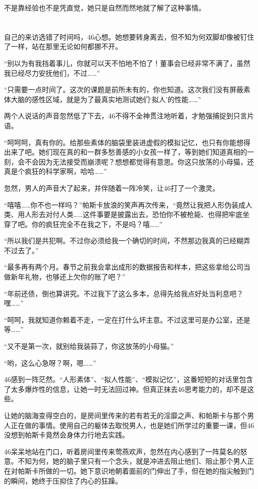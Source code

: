 不是靠经验也不是凭直觉，她只是自然而然地就了解了这种事情。

\section*{}

自己的来访选错了时间吗，46心想。她想要转身离去，但不知为何双脚却像被钉住了一样，站在那里无论如何都挪不开。

“别以为有我挡着事儿，你就可以天不怕地不怕了！董事会已经非常不满了，虽然我已经尽力安抚他们，不过……”

“只需要一点时间了。这次的课题是前所未有的，你也知道。这次我们没有屏蔽素体大脑的感性区域，就是为了最真实地测试她们‘拟人’的性能……”

两个人说话的声音忽然低了下去，46不得不全神贯注地听着，才勉强捕捉到只言片语。

“呵呵呵，真有你的。给那些素体的脑袋里装进虚假的模拟记忆，也只有你能想得出来了吧。她们现在真的和一群多愁善感的小女孩一样了，等到她们知道真相的一刻，会不会因为无法接受而崩溃呢？想想都觉得有意思。你这只放荡的小母猫，还真是个疯狂的科学家啊，哈哈……”

忽然，男人的声音大了起来，并伴随着一阵冷笑，让46打了一个激灵。

“嘻嘻……你不也一样吗？”帕斯卡放浪的笑声再次传来，“竟然让我把人形伪装成人类、用人形去对付人类……这件事要是披露出去，恐怕你不被枪毙、也得把牢底坐穿了吧。你的疯狂完全不在我之下，不是吗？嘻……”

“所以我们是共犯啊。不过你必须给我一个确切的时间，不然那边我真的已经糊弄不过去了。”

“最多再有两个月。春节之前我会拿出成形的数据报告和样本，把这些拿给公司当做新年礼物，也够还上欠你的账了吧？”

“年前还债，倒也算讲究。不过我下了这么多本，总得先给我点好处当利息吧？嘿……”

“呵呵，我就知道你赖着不走，一定在打什么坏主意。不过这里可是办公室，还是等……”

“又不是第一次，就别给我装蒜了，你这放荡的小母猫。”

“哟，这么心急呀？啊，嗯……”

46感到一阵茫然。“人形素体”、“拟人性能”、“模拟记忆”，这番短短的对话里包含了太多爆炸性的信息，让她一时无法回过神。但真正抹去46思考能力的，却不是这些。

让她的脑海变得空白的，是房间里传来的若有若无的淫靡之声、和帕斯卡与那个男人正在做的事情。使用自己的躯体去取悦男人，也是她们所学过的重要一课，但46没想到帕斯卡竟然会身体力行地去实践。

46呆呆地站在门口，听着房间里传来莺燕欢声，忽然在内心感到了一阵莫名的怒意。不知为何，她的脑子里只有一个念头，就是冲进去阻止他们、阻止那个男人正在对帕斯卡所做的一切。她下意识地朝着面前的门伸出了手，但在她的指尖触到门的瞬间，她终于压抑住了内心的狂躁。

